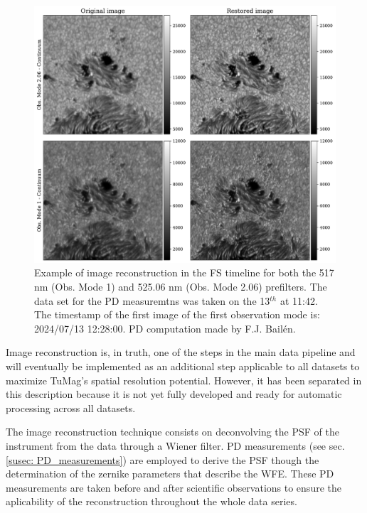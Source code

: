 \begin{figure}[h]
  \begin{minipage}[c]{0.67\textwidth}
    \includegraphics[width=\textwidth]{figures/Pipeline/Image_restoration.pdf}
  \end{minipage}\hfill
  \begin{minipage}[c]{0.29\textwidth}
    \caption[Image reconstruction.]{
     Example of image reconstruction in the FS timeline for both the 517 nm (Obs. Mode 1) and 525.06 nm (Obs. Mode 2.06) prefilters. The data set for the PD measuremtns was taken on the 13$^{th}$ at 11:42. The timestamp of the first image of the first observation mode is: 2024/07/13 12:28:00. PD computation made by F.J. Bailén.
     \label{fig_pipeline:  image_restoration}} 
  \end{minipage}
\end{figure}

Image reconstruction is, in truth, one of the steps in the main data pipeline and will eventually be implemented as an additional step applicable to all datasets to maximize TuMag's spatial resolution potential. However, it has been separated in this description because it is not yet fully developed and ready for automatic processing across all datasets.

The image reconstruction technique consists on deconvolving the PSF of the instrument from the data through a Wiener filter. PD measurements (see sec. \ref{susec: PD_measurements}) are employed to derive the PSF though the determination of the zernike parameters that describe the WFE. These PD measurements are taken before and after scientific observations to ensure the aplicability of the reconstruction throughout the whole data series.

